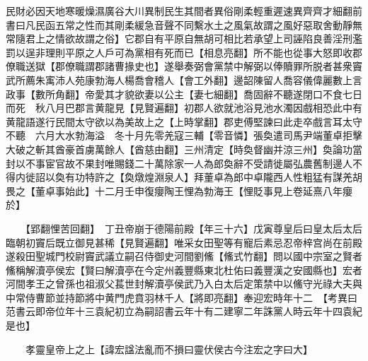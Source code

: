 民財必因天地寒暖燥濕廣谷大川異制民生其間者異俗剛柔輕重遲速異齊齊才細翻前書曰凡民函五常之性而其剛柔緩急音聲不同繫水土之風氣故謂之風好惡取舍動靜無常隨君上之情欲故謂之俗】它郡自有平原自無胡可相比若承望上司誣陷良善淫刑濫罰以逞非理則平原之人戶可為黨相有死而已【相息亮翻】所不能也從事大怒即收郡僚職送獄【郡僚職謂郡諸曹掾史也】遂舉奏弼會黨禁中解弼以俸贖罪所脱者甚衆竇武所薦朱㝢沛人苑康勃海人楊喬會稽人【會工外翻】邊韶陳留人喬容儀偉麗數上言政事【數所角翻】帝愛其才貌欲妻以公主【妻七細翻】喬固辭不聽遂閉口不食七日而死　秋八月巴郡言黄龍見【見賢遍翻】初郡人欲就池浴見池水濁因戲相恐此中有黄龍語遂行民間太守欲以為美故上之【上時掌翻】郡吏傅堅諫曰此走卒戲言耳太守不聽　六月大水勃海溢　冬十月先零羌寇三輔【零音憐】張奐遣司馬尹端董卓拒擊大破之斬其酋豪首虜萬餘人【酋慈由翻】三州清定【時奐督幽并涼三州】奐論功當封以不事宦官故不果封唯賜錢二十萬除家一人為郎奐辭不受請徙屬弘農舊制邊人不得内徙詔以奐有功特許之【奐燉煌淵泉人】拜董卓為郎中卓隴西人性粗猛有謀羌胡畏之【董卓事始此】十二月壬申復癭陶王悝為勃海王【悝貶事見上卷延熹八年癭於】

　　【郢翻悝苦回翻】　丁丑帝崩于德陽前殿【年三十六】戊寅尊皇后曰皇太后太后臨朝初竇后既立御見甚稀【見賢遍翻】唯采女田聖等有寵后素忌忍帝梓宫尚在前殿遂殺田聖城門校尉竇武議立嗣召侍御史河間劉鯈【鯈式竹翻】問以國中宗室之賢者鯈稱解瀆亭侯宏【賢曰解瀆亭在今定州義豐縣東北杜佑曰義豐漢之安國縣也】宏者河間孝王之曾孫也祖淑父萇世封解瀆亭侯武乃入白太后定策禁中以鯈守光祿大夫與中常侍曹節並持節將中黄門虎賁羽林千人【將即亮翻】奉迎宏時年十二　【考異曰范書云即帝位年十三袁紀初立為嗣詔書云年十有二建寧二年誅黨人時云年十四袁紀是也】

　　孝靈皇帝上之上【諱宏諡法亂而不損曰靈伏侯古今注宏之字曰大】

